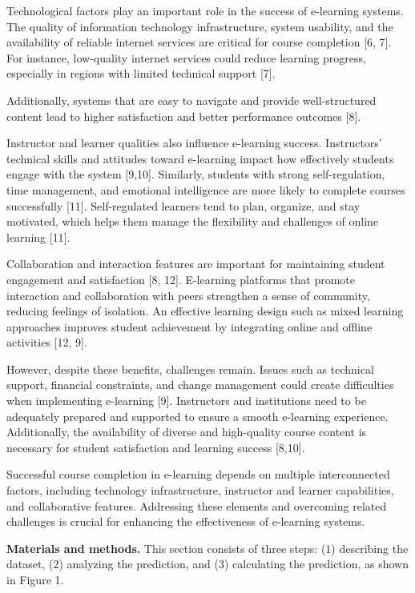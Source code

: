 \begin{multicols}{2}
Technological factors play an important role in the success of
e-learning systems. The quality of information technology
infrastructure, system usability, and the availability of reliable
internet services are critical for course completion {[}6, 7{]}. For
instance, low-quality internet services could reduce learning progress,
especially in regions with limited technical support {[}7{]}.

Additionally, systems that are easy to navigate and provide
well-structured content lead to higher satisfaction and better
performance outcomes {[}8{]}.

Instructor and learner qualities also influence e-learning success.
Instructors' technical skills and attitudes toward e-learning impact how
effectively students engage with the system {[}9,10{]}. Similarly,
students with strong self-regulation, time management, and emotional
intelligence are more likely to complete courses successfully {[}11{]}.
Self-regulated learners tend to plan, organize, and stay motivated,
which helps them manage the flexibility and challenges of online
learning {[}11{]}.

Collaboration and interaction features are important for maintaining
student engagement and satisfaction {[}8, 12{]}. E-learning platforms
that promote interaction and collaboration with peers strengthen a sense
of community, reducing feelings of isolation. An effective learning
design such as mixed learning approaches improves student achievement by
integrating online and offline activities {[}12, 9{]}.

However, despite these benefits, challenges remain. Issues such as
technical support, financial constraints, and change management could
create difficulties when implementing e-learning {[}9{]}. Instructors
and institutions need to be adequately prepared and supported to ensure
a smooth e-learning experience. Additionally, the availability of
diverse and high-quality course content is necessary for student
satisfaction and learning success {[}8,10{]}.

Successful course completion in e-learning depends on multiple
interconnected factors, including technology infrastructure, instructor
and learner capabilities, and collaborative features. Addressing these
elements and overcoming related challenges is crucial for enhancing the
effectiveness of e-learning systems.

{\bfseries Materials and methods.} This section consists of three steps:
(1) describing the dataset, (2) analyzing the prediction, and (3)
calculating the prediction, as shown in Figure 1.
\end{multicols}

